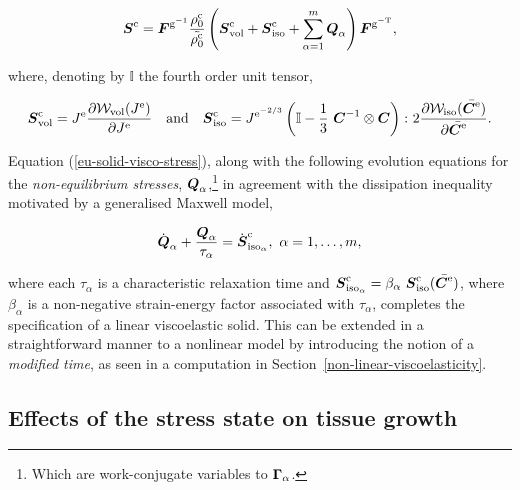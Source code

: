 \begin{equation}
\mbox{\boldmath$ S$}^{\mathrm{c}} = \mbox{\boldmath$ F$}^{\mathrm{g}^{\mathrm{-1}}}
\frac{\rho_{0}^{\mathrm{c}}}{\tilde{\rho_{0}^{\mathrm{c}}}}\left(
\mbox{\boldmath$ S$}^{\mathrm{c}}_{\mathrm{vol}}+\mbox{\boldmath$ S$}^{\mathrm{c}}_{\mathrm{iso}}+
\sum_{\alpha=1}^{m}\mbox{\boldmath$ Q$}_{\alpha} \right)
\mbox{\boldmath$ F$}^{\mathrm{g}^{\mathrm{-T}}},
\label{eu-solid-visco-stress}
\end{equation}

\noindent where, denoting by $\mathbb{I}$ the fourth order unit
tensor,

\begin{equation*}
\mbox{\boldmath$ S$}^{\mathrm{c}}_{\mathrm{vol}} = J^{\mathrm{e}} \frac{\partial
  {\mathcal W}_{\mathrm{vol}}(J^{\mathrm{e}})}{\partial J^{\mathrm{e}}} \quad
\mathrm{and} \quad \mbox{\boldmath$ S$}^{\mathrm{c}}_{\mathrm{iso}} =
J^{\mathrm{e}^{-2/3}} \left(\mathbb{I} - \frac{1}{3}\ \mbox{\boldmath$ C$}^{-1} \otimes
\mbox{\boldmath$ C$} \right) \colon 2 
\frac{\partial{\mathcal W}_{\mathrm{iso}}(\bar{\mbox{\boldmath$ C$}^{\mathrm{e}}})}{\partial
  \bar{\mbox{\boldmath$ C$}^{\mathrm{e}}}}.
\end{equation*}

\noindent Equation (\ref{eu-solid-visco-stress}), along with the
following evolution equations for the {\em non-equilibrium stresses},
$\mbox{\boldmath$ Q$}_{\alpha}$,\footnote{Which are work-conjugate variables to
  $\mbox{\boldmath$\Gamma$}_{\alpha}$.} in agreement with the dissipation inequality
motivated by a generalised Maxwell model,

\begin{equation}
\dot{\mbox{\boldmath$ Q$}}_{\alpha}+\frac{\mbox{\boldmath$ Q$}_{\alpha}}{\tau_{\alpha}} =
\dot{\mbox{\boldmath$ S$}}^{\mathrm{c}}_{\mathrm{iso}_{\alpha}},\ \alpha=1,\ldots,m,
\label{eu-linearviscoelasticity}
\end{equation}

\noindent where each $\tau_{\alpha}$ is a characteristic relaxation
time and $\mbox{\boldmath$ S$}^{\mathrm{c}}_{\mathrm{iso}_{\alpha}} =
\beta_{\alpha}\ \mbox{\boldmath$ S$}^{\mathrm{c}}_{\mathrm{iso}}
(\bar{\mbox{\boldmath$ C$}^{\mathrm{e}}})$, where $\beta_{\alpha}$ is a non-negative
strain-energy factor associated with $\tau_{\alpha}$, completes the
specification of a linear viscoelastic solid. This can be extended in
a straightforward manner to a nonlinear model by introducing the
notion of a {\em modified time}, as seen in a computation in
Section~\ref{non-linear-viscoelasticity}.

\subsection{Effects of the stress state on tissue growth}
\label{eu-stress-dependent-growth}

